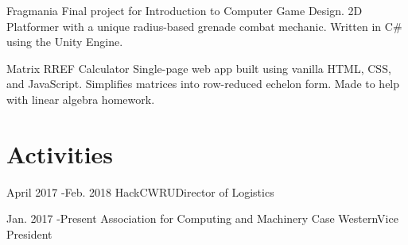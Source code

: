 \documentclass[10pt]{article} %
\begin{document}
\project
{Fragmania}
{Final project for Introduction to Computer Game Design. 2D Platformer with a unique radius-based grenade combat mechanic. Written in C\# using the Unity Engine.}

\project
{Matrix RREF Calculator}
{Single-page web app built using vanilla HTML, CSS, and JavaScript. Simplifies matrices into row-reduced echelon form. Made to help with linear algebra homework.}

\section{Activities}
\activity
{April 2017 -}{Feb. 2018}
{HackCWRU}{Director of Logistics}

\activity
{Jan. 2017 -}{Present}
{Association for Computing and Machinery Case Western}{Vice President}
\end{document}
